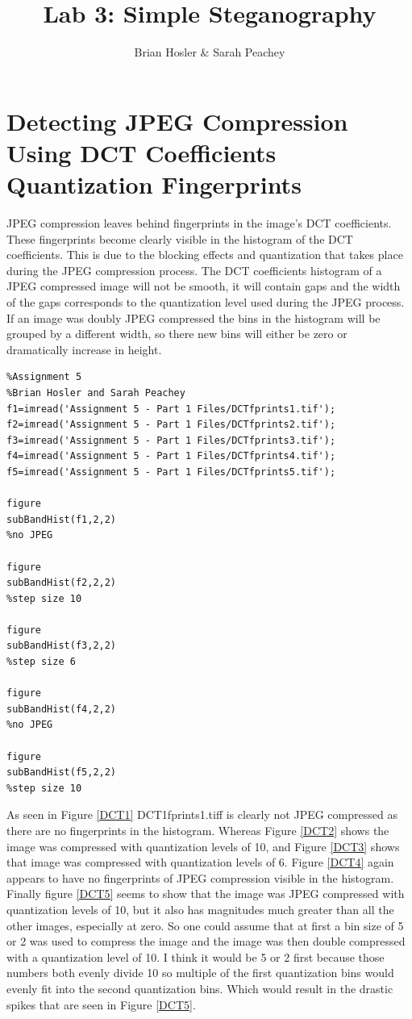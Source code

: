 \documentclass{article}
\begin{document}
\title{Lab 3: Simple Steganography}
\author{Brian Hosler \& Sarah Peachey }
\maketitle


\section{Detecting JPEG Compression Using DCT Coefficients Quantization
Fingerprints}

\qquad JPEG compression leaves behind fingerprints in the image's DCT coefficients.
These fingerprints become clearly visible in the histogram of the DCT coefficients. This
is due to the blocking effects and quantization that takes place during the JPEG compression
process. The DCT coefficients histogram of a JPEG compressed image will not
be smooth, it will contain gaps and the width of the gaps corresponds to the
quantization level used during the JPEG process. If an image was doubly JPEG
compressed the bins in the histogram will be grouped by a different width,
so there new bins will either be zero or dramatically increase in height. 

    
    \begin{verbatim}
%Assignment 5
%Brian Hosler and Sarah Peachey
f1=imread('Assignment 5 - Part 1 Files/DCTfprints1.tif');
f2=imread('Assignment 5 - Part 1 Files/DCTfprints2.tif');
f3=imread('Assignment 5 - Part 1 Files/DCTfprints3.tif');
f4=imread('Assignment 5 - Part 1 Files/DCTfprints4.tif');
f5=imread('Assignment 5 - Part 1 Files/DCTfprints5.tif');

figure
subBandHist(f1,2,2)
%no JPEG

figure
subBandHist(f2,2,2)
%step size 10

figure
subBandHist(f3,2,2)
%step size 6

figure
subBandHist(f4,2,2)
%no JPEG

figure
subBandHist(f5,2,2)
%step size 10
\end{verbatim}

\newpage 

As seen in Figure \ref{DCT1} DCT1fprints1.tiff is clearly not JPEG
compressed as there are no fingerprints in the histogram. Whereas Figure \ref{DCT2}
shows the image was compressed with quantization levels of 10, and Figure \ref{DCT3}
shows that image was compressed with quantization levels of 6. Figure
\ref{DCT4} again appears to have no fingerprints of JPEG compression visible
in the histogram. Finally figure \ref{DCT5} seems to show that the image was
JPEG compressed with quantization levels of 10, but it also has magnitudes
much greater than all the other images, especially at zero. So one could
assume that at first a bin size of 5 or 2 was used to compress the image and
the image was then double compressed with a quantization level of 10. I think
it would be 5 or 2 first because those numbers both evenly divide 10 so
multiple of the first quantization bins would evenly fit into the second
quantization bins. Which would result in the drastic spikes that are seen in
Figure \ref{DCT5}. 
\end{document}
